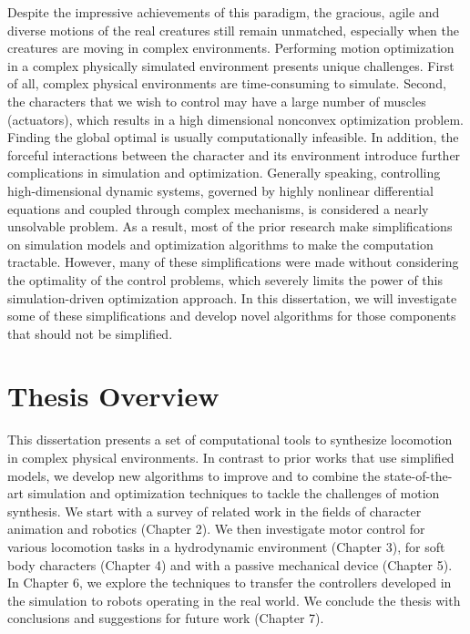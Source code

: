 Despite the impressive achievements of this paradigm, the gracious, agile and diverse motions of the real creatures still remain unmatched, especially when the creatures are moving in complex environments. Performing motion optimization in a complex physically simulated environment presents unique challenges. First of all, complex physical environments are time-consuming to simulate. Second, the characters that we wish to control may have a large number of muscles (actuators), which results in a high dimensional nonconvex optimization problem. Finding the global optimal is usually computationally infeasible. In addition, the forceful interactions between the character and its environment introduce further complications in simulation and optimization. Generally speaking, controlling high-dimensional dynamic systems, governed by highly nonlinear differential equations and coupled through complex mechanisms, is considered a nearly unsolvable problem. As a result, most of the prior research make simplifications on simulation models and optimization algorithms to make the computation tractable. However, many of these simplifications were made without considering the optimality of the control problems, which severely limits the power of this simulation-driven optimization approach. In this dissertation, we will investigate some of these simplifications and develop novel algorithms for those components that should not be simplified. 


\section{Thesis Overview}

This dissertation presents a set of computational tools to synthesize locomotion in complex physical environments. In contrast to prior works that use simplified models, we develop new algorithms to improve and to combine the state-of-the-art simulation and optimization techniques to tackle the challenges of motion synthesis. We start with a survey of related work in the fields of character animation and robotics (Chapter 2). We then investigate motor control for various locomotion tasks in a hydrodynamic environment (Chapter 3), for soft body characters (Chapter 4) and with a passive mechanical device (Chapter 5). In Chapter 6, we explore the techniques to transfer the controllers developed in the simulation to robots operating in the real world. We conclude the thesis with conclusions and suggestions for future work (Chapter 7).

